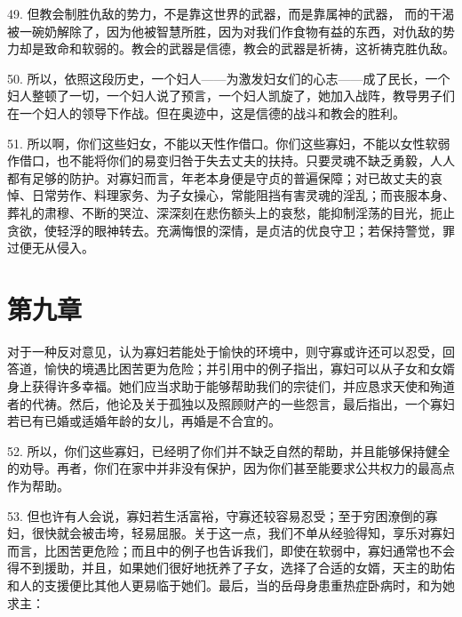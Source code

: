 49. 但教会制胜仇敌的势力，不是靠这世界的武器，而是靠属神的武器， 而的干渴被一碗奶解除了，因为他被智慧所胜，因为对我们作食物有益的东西，对仇敌的势力却是致命和软弱的。教会的武器是信德，教会的武器是祈祷，这祈祷克胜仇敌。\par

50. 所以，依照这段历史，一个妇人——为激发妇女们的心志——成了民长，一个妇人整顿了一切，一个妇人说了预言，一个妇人凯旋了，她加入战阵，教导男子们在一个妇人的领导下作战。但在奥迹中，这是信德的战斗和教会的胜利。\par

51. 所以啊，你们这些妇女，不能以天性作借口。你们这些寡妇，不能以女性软弱作借口，也不能将你们的易变归咎于失去丈夫的扶持。只要灵魂不缺乏勇毅，人人都有足够的防护。对寡妇而言，年老本身便是守贞的普遍保障；对已故丈夫的哀悼、日常劳作、料理家务、为子女操心，常能阻挡有害灵魂的淫乱；而丧服本身、葬礼的肃穆、不断的哭泣、深深刻在悲伤额头上的哀愁，能抑制淫荡的目光，扼止贪欲，使轻浮的眼神转去。充满悔恨的深情，是贞洁的优良守卫；若保持警觉，罪过便无从侵入。\par


\section{第九章}

对于一种反对意见，认为寡妇若能处于愉快的环境中，则守寡或许还可以忍受，回答道，愉快的境遇比困苦更为危险；并引用中的例子指出，寡妇可以从子女和女婿身上获得许多幸福。她们应当求助于能够帮助我们的宗徒们，并应恳求天使和殉道者的代祷。然后，他论及关于孤独以及照顾财产的一些怨言，最后指出，一个寡妇若已有已婚或适婚年龄的女儿，再婚是不合宜的。\par

52. 所以，你们这些寡妇，已经明了你们并不缺乏自然的帮助，并且能够保持健全的劝导。再者，你们在家中并非没有保护，因为你们甚至能要求公共权力的最高点作为帮助。\par

53. 但也许有人会说，寡妇若生活富裕，守寡还较容易忍受；至于穷困潦倒的寡妇，很快就会被击垮，轻易屈服。关于这一点，我们不单从经验得知，享乐对寡妇而言，比困苦更危险；而且中的例子也告诉我们，即使在软弱中，寡妇通常也不会得不到援助，并且，如果她们很好地抚养了子女，选择了合适的女婿，天主的助佑和人的支援便比其他人更易临于她们。最后，当的岳母身患重热症卧病时，和为她求主：\par

